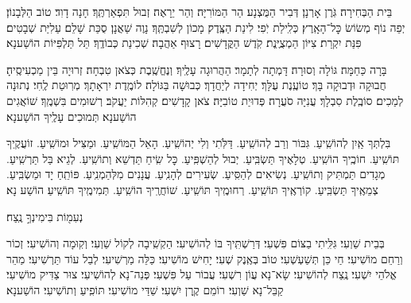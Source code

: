 \documentclass[twoside, openany, parskip=half, 11pt]{book}
\begin{document}

בֵּית הַבְּחִירָה׃ גֹּֽרֶן אָרְנָן׃ דְּבִיר הַמֻּצְנָע׃ הַר הַמּוֹרִיָּה׃ וְהַר יֵרָאֶה׃ זְבוּל תִּפְאַרְתֶּֽךָ׃ חָנָה דָוִד׃ טוֹב הַלְּבָנוֹן׃ יְפֵה נוֹף מְשׂוֹשׂ כׇּל־הָאָֽרֶץ׃ כְּלִֽילַת יֹֽפִי׃ לִינַת הַצֶּֽדֶק׃ מָכוֹן לְשִׁבְתֶּֽךָ׃ נָוֶה שַׁאֲנָן׃ סֻכַּת שָׁלֵם׃ עַלִיַּת שְׁבָטִים׃ פִּנַּת יִקְרַת׃ צִיּוֹן הַמְצֻיֶּֽנֶת׃ קֹֽדֶשׁ הַקֳּדָשִׁים׃ רָצוּף אַהֲבָה׃
שְׁכִינַת כְּבוֹדֶֽךָ׃
תֵּל תַּלְפִּיּוֹת הוֹשַׁענָא׃


בָּרָה כַּחַמָּה׃ גּוֹלָה וְסוּרָה׃ דָּמְתָה לְתָמָר׃ הַהֲרוּגָה עָלֶֽיךָ׃ וְנֶחֱשֶֽׁבֶת כְּצֹאן טִבְחָה׃ זְרוּיָה בֵּין מַכְעִיסֶֽיהָ׃ חֲבוּקָה וּדְבוּקָה בָּךְ׃ טוֹעֶֽנֶת עֻלָּךְ׃ יְחִידָה לְיַחֲדָךְ׃ כְּבוּשָׁה בַּגּוֹלָה׃ לוֹמֶֽדֶת יִרְאָתָךְ׃ מְרֽוּטַת לֶֽחִי׃ נְתוּנָה לְמַכִים׃ סוֹבֶֽלֶת סִבְלָךְ׃ עֲנִיָּה סֹעֲרָה׃ פְּדוּיַת טוֹבִיָּה׃ צֹאן קָדָשִׁים׃ קְהִלּוֹת יַעֲקֹב׃ רְשׁוּמִים בִּשְׁמֶֽךָ׃
שׁוֹאֲגִים הוֹשַׁענָא׃
תְּמוּכִים עָלֶֽיךָ הוֹשַׁענָא׃


בִּלְתְּךָ אַֽיִן לְהוֹשִֽׁיעַ. גִּבּוֹר וְרַב לְהוֹשִֽׁיעַ. דַּלֹּֽתִי וְלִי יְהוֹשִֽׁיעַ. הָאֵל הַמּוֹשִֽׁיעַ. וּמַצִּיל וּמוֹשִֽׁיעַ. זוֹעֲקֶֽיךָ תּוֹשִֽׁיעַ. חוֹכֶֽיךָ הוֹשִֽׁיעַ. טְלָאֶיךָ תַּשְׂבִּֽיעַ. יְבוּל לְהַשְׁפִּֽיעַ. כׇּל שִֽׂיחַ תַּדְשֵׁא וְתוֹשִֽׁיעַ. לְגֵיא בַּל תַּרְשִֽׁיעַ. מְגָדִים תַּמְתִּיק וְתוֹשִֽׁיעַ. נְשִׂיאִים לְהַסִּֽיעַ. שְׂעִירִים לְהָנִֽיעַ. עֲנָנִים מִלְּהַמְנִֽיעַ. פּוֹתֵֽחַ יָד וּמַשְׂבִּֽיעַ. צְמֵאֶֽיךָ תַּשְׂבִּֽיעַ. קוֹרְאֶֽיךָ תּוֹשִֽׁיעַ. רְחוּמֶֽיךָ תּוֹשִֽׁיעַ. שׁוֹחֲרֶֽיךָ הוֹשִֽׁיעַ. תְּמִימֶֽיךָ תּוֹשִֽׁיעַ׃ הוֹשַׁע נָא׃

נְעִמ֖וֹת בִּימִינְךָ֣ נֶֽצַח׃

בְּבֵית שַׁוְעִי׃ גִּלִּֽיתִי בַצּוֹם פִּשְׁעִי׃ דְּרַשְׁתִּֽיךָ בּוֹ לְהוֹשִׁיעִי׃ הַקְשִֽׁיבָה לְקוֹל שַׁוְעִי׃ וְקֽוּמָה וְהוֹשִׁיעִי׃ זְכוֹר וְרַחֵם מוֹשִׁיעִי׃ חַי כֵּן תְּשַׁעְשְׁעִי׃ טוֹב בְּאֶֽנֶק שְׁעִי׃ יָחִישׁ מוֹשִׁיעִי׃ כַּלֵּה מַרְשִׁיעִי׃ לְבַל עוֹד תַּרְשִׁיעִי׃ מַהֵר אֱלֹהֵי יִשְׁעִי׃ נֶֽצַח לְהוֹשִׁיעִי׃ שָׂא־נָא עֲוֹן רִשְׁעִי׃ עֲבוֹר עַל פִּשְׁעִי׃ פְּנֵה־נָא לְהוֹשִׁיעִי׃ צוּר צַדִּיק מוֹשִׁיעִי׃ קַבֵּל־נָא שַׁוְעִי׃ רוֹמֵם קֶֽרֶן יִשְׁעִי׃
שַׁדַּי מוֹשִׁיעִי׃ תּוֹפִֽיעַ וְתוֹשִׁיעִי׃ הוֹשַׁענָא׃
\end{document}
